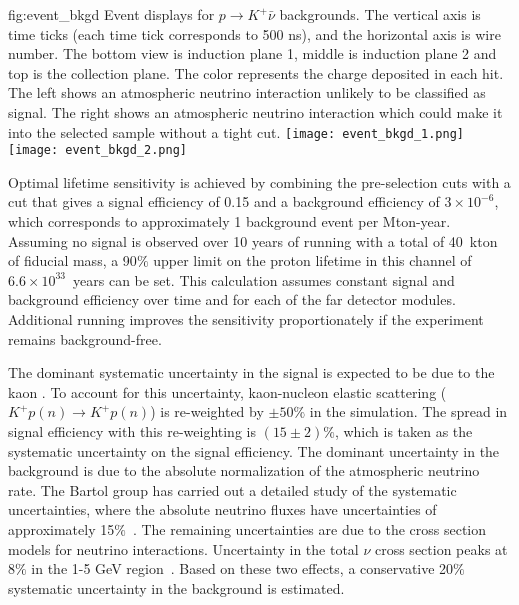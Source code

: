 \begin{dunefigure}
{fig:event_bkgd}
{Event displays for $p\rightarrow K^{+} \bar{\nu}$ backgrounds.  The vertical axis is time ticks (each time tick corresponds to 500 ns), and the horizontal axis is wire number. The bottom view is induction plane 1, middle is induction plane 2 and top is the collection plane. The color represents the charge deposited in each hit. The left shows an atmospheric neutrino interaction unlikely to be classified as signal. The right shows an atmospheric neutrino interaction which could make it into the selected sample without a tight cut.}
\texttt{[image: event\_bkgd\_1.png]}
\texttt{[image: event\_bkgd\_2.png]}
\end{dunefigure}

Optimal lifetime sensitivity is achieved by combining the pre-selection cuts with a  cut that gives a signal efficiency of 0.15 and a background efficiency of $3\times 10^{-6}$, which corresponds to approximately 1 background event per Mton-year. Assuming no signal is observed over 10 years of running with a total of 40~kton of fiducial mass, a 90$\%$  upper limit on the proton lifetime in this channel of $6.6\times10^{33}$~years can be set. This calculation assumes constant signal and background efficiency over time and for each of the far detector modules.  Additional running improves the sensitivity proportionately if the experiment remains background-free.

The dominant systematic uncertainty in the signal is expected to be due to the kaon . To account for this uncertainty, kaon-nucleon elastic scattering ($K^{+}p(n)\rightarrow K^{+}p(n)$) is re-weighted by $\pm 50\%$ in the simulation. The spread in signal efficiency with this re-weighting is $(15\pm 2)\%$, which is taken as the  systematic uncertainty on the signal efficiency.
The dominant uncertainty in the background 
is due to the absolute normalization of the atmospheric neutrino rate. The Bartol group has carried out a detailed study of the systematic uncertainties, where the absolute neutrino fluxes have uncertainties of approximately 15$\%$~\cite{Barr:2006it}.
The remaining uncertainties are due to the cross section models for neutrino interactions. Uncertainty in the total $\nu$  cross section peaks at 8$\%$ in the 1-5 GeV region~\cite{Adamson:2012gt}.
Based on these two effects, a conservative 20$\%$ systematic uncertainty in the background is estimated.

